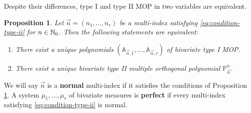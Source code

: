 \documentclass[portrait,final,a0paper,fontscale=0.38]{baposter}
\newtheorem{proposition}{Proposition}
\begin{document}
\begin{poster}
{\begin{multicols}{2}
Despite their differences, type I and type II MOP in two variables are equivalent.
\begin{proposition}
  \label{prop:existence}
  Let $\vec n = (n_1,\dots,n_r)$ be a multi-index satisfying \eqref{eq:condition-type-ii} for $n\in\mathbb{N}_0$. Then the following statements are equivalent:
  \begin{enumerate}
      \item There exist a unique polynomials $(\mathbb A_{\vec n,1}, \dots, \mathbb A_{\vec n,r})$ of bivariate type I MOP.
      \item There exist a unique bivariate type II multiple orthogonal polynomial $\mathbb P_{\vec n}^n$.
  \end{enumerate}
\end{proposition}
We will say $\vec n$ is a \textbf{normal} multi-index if it satisfies the conditions of Proposition \ref{prop:existence}. A system $\mu_1,\dots,\mu_r$ of bivariate measures is \textbf{perfect} if every multi-index satisfying \eqref{eq:condition-type-ii} is normal.

\end{multicols}
}
%
{

}
\end{poster}
\end{document}

